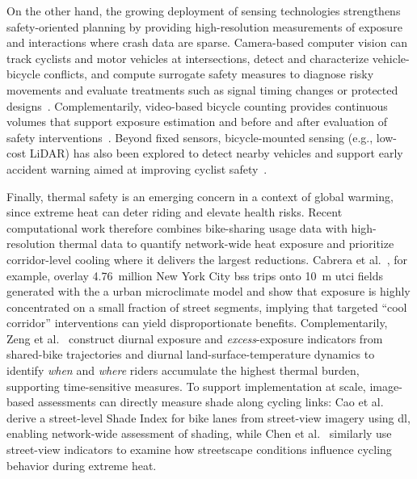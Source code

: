     On the other hand, the growing deployment of sensing technologies strengthens safety-oriented planning by providing high-resolution measurements of exposure and interactions where crash data are sparse. Camera-based computer vision can track cyclists and motor vehicles at intersections, detect and characterize vehicle-bicycle conflicts, and compute surrogate safety measures to diagnose risky movements and evaluate treatments such as signal timing changes or protected designs~\cite{Sayed2013, Saunier2007}. Complementarily, video-based bicycle counting provides continuous volumes that support exposure estimation and before and after evaluation of safety interventions~\cite{Rogers2000}. Beyond fixed sensors, bicycle-mounted sensing (e.g., low-cost LiDAR) has also been explored to detect nearby vehicles and support early accident warning aimed at improving cyclist safety~\cite{Blankenau2018}.

    Finally, thermal safety is an emerging concern in a context of global warming, since extreme heat can deter riding and elevate health risks. Recent computational work therefore combines bike-sharing usage data with high-resolution thermal data to quantify network-wide heat exposure and prioritize corridor-level cooling where it delivers the largest reductions. Cabrera et al.~\cite{Cabrera2025}, for example, overlay 4.76~million New York City \ac{bss} trips onto 10~m \ac{utci} fields generated with the a urban microclimate model and show that exposure is highly concentrated on a small fraction of street segments, implying that targeted ``cool corridor'' interventions can yield disproportionate benefits. Complementarily, Zeng et al.~\cite{Zeng2025} construct diurnal exposure and \emph{excess}-exposure indicators from shared-bike trajectories and diurnal land-surface-temperature dynamics to identify \emph{when} and \emph{where} riders accumulate the highest thermal burden, supporting time-sensitive measures. To support implementation at scale, image-based assessments can directly measure shade along cycling links: Cao et al.~\cite{Cao2024} derive a street-level Shade Index for bike lanes from street-view imagery using \ac{dl}, enabling network-wide assessment of shading, while Chen et al.~\cite{Chen2025StreetView} similarly use street-view indicators to examine how streetscape conditions influence cycling behavior during extreme heat.
